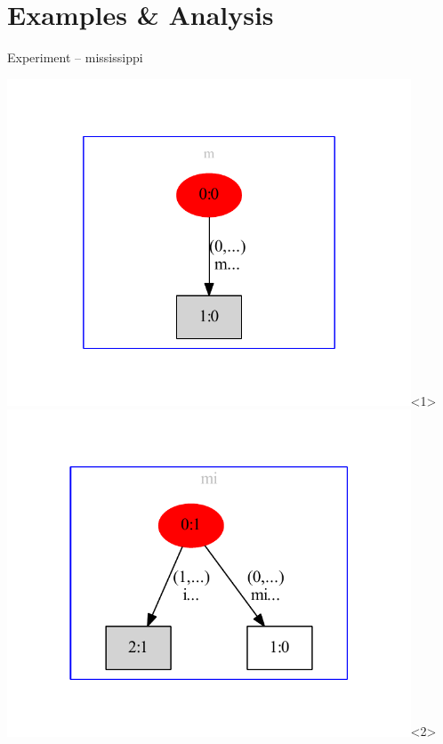 \section{Examples \& Analysis}
\begin{frame}[shrink=13]{Experiment -- mississippi}

\begin{overlayarea}{\textwidth}{\textheight}
\includegraphics[keepaspectratio,trim=40pt 40pt 40pt 40pt,height=0.8\textheight,width=0.9\textwidth]{m.pdf}<1>
\includegraphics[keepaspectratio,trim=40pt 40pt 40pt 40pt,height=0.8\textheight,width=0.9\textwidth]{mi.pdf}<2>

\end{overlayarea}
\end{frame}
